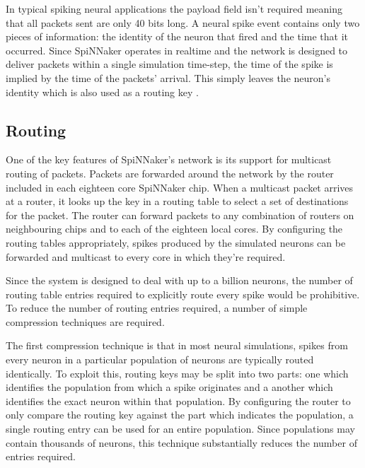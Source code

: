 			In typical spiking neural applications the payload field isn't required
			meaning that all packets sent are only 40 bits long. A neural spike event
			contains only two pieces of information: the identity of the neuron that
			fired and the time that it occurred. Since SpiNNaker operates in realtime
			and the network is designed to deliver packets within a single simulation
			time-step, the time of the spike is implied by the time of the packets'
			arrival. This simply leaves the neuron's identity which is also used as a
			routing key \cite{davies12}.
		
		\subsection{Routing}
			
			\label{sec:spinn-router}
			
			One of the key features of SpiNNaker's network is its support for
			multicast routing of packets. Packets are forwarded around the network by
			the router included in each eighteen core SpiNNaker chip. When a multicast
			packet arrives at a router, it looks up the key in a routing table to
			select a set of destinations for the packet. The router can forward
			packets to any combination of routers on neighbouring chips and to each of
			the eighteen local cores. By configuring the routing tables appropriately,
			spikes produced by the simulated neurons can be forwarded and multicast to
			every core in which they're required.
			
			Since the system is designed to deal with up to a billion neurons, the
			number of routing table entries required to explicitly route every spike
			would be prohibitive. To reduce the number of routing entries required, a
			number of simple compression techniques are required.
			
			The first compression technique is that in most neural simulations, spikes
			from every neuron in a particular population of neurons are typically
			routed identically. To exploit this, routing keys may be split into two
			parts: one which identifies the population from which a spike originates
			and a another which identifies the exact neuron within that population.
			By configuring the router to only compare the routing key against the part
			which indicates the population, a single routing entry can be used for an
			entire population. Since populations may contain thousands of neurons,
			this technique substantially reduces the number of entries required.
			
